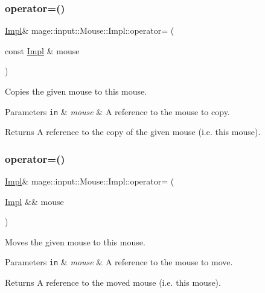 \subsubsection{\texorpdfstring{operator=()}{operator=()}\hspace{0.1cm}{\footnotesize\ttfamily [1/2]}}
{\footnotesize\ttfamily \mbox{\hyperlink{classmage_1_1input_1_1_mouse_1_1_impl}{Impl}}\& mage\+::input\+::\+Mouse\+::\+Impl\+::operator= (\begin{DoxyParamCaption}\item[{const \mbox{\hyperlink{classmage_1_1input_1_1_mouse_1_1_impl}{Impl}} \&}]{mouse }\end{DoxyParamCaption})\hspace{0.3cm}{\ttfamily [delete]}}

Copies the given mouse to this mouse.


\begin{DoxyParams}[1]{Parameters}
\mbox{\tt in}  & {\em mouse} & A reference to the mouse to copy. \\
\hline
\end{DoxyParams}
\begin{DoxyReturn}{Returns}
A reference to the copy of the given mouse (i.\+e. this mouse). 
\end{DoxyReturn}
\mbox{\label{classmage_1_1input_1_1_mouse_1_1_impl_ae994602de981918d84a0b836a403f941}} 
\subsubsection{\texorpdfstring{operator=()}{operator=()}\hspace{0.1cm}{\footnotesize\ttfamily [2/2]}}
{\footnotesize\ttfamily \mbox{\hyperlink{classmage_1_1input_1_1_mouse_1_1_impl}{Impl}}\& mage\+::input\+::\+Mouse\+::\+Impl\+::operator= (\begin{DoxyParamCaption}\item[{\mbox{\hyperlink{classmage_1_1input_1_1_mouse_1_1_impl}{Impl}} \&\&}]{mouse }\end{DoxyParamCaption})\hspace{0.3cm}{\ttfamily [delete]}}

Moves the given mouse to this mouse.


\begin{DoxyParams}[1]{Parameters}
\mbox{\tt in}  & {\em mouse} & A reference to the mouse to move. \\
\hline
\end{DoxyParams}
\begin{DoxyReturn}{Returns}
A reference to the moved mouse (i.\+e. this mouse). 
\end{DoxyReturn}
\mbox{\label{classmage_1_1input_1_1_mouse_1_1_impl_a572b3d4c288bb91d07dc2ae1d57b6e3d}} 
